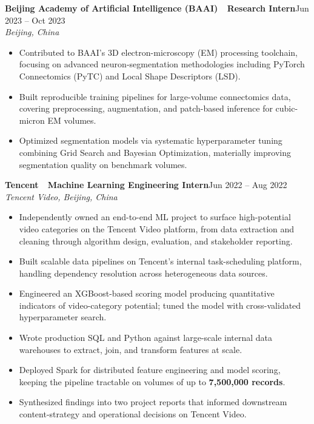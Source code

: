 \documentclass[11pt,letterpaper]{article}
\newcommand{\entry}[4]{%
  \noindent\textbf{\color{ink}#1}\hfill{\color{soft}\small #3}\\[1pt]%
  \textit{\color{muted}#2}\hfill\textit{\color{soft}\small #4}%
  \vspace{2pt}%
}
\begin{document}
\vspace{4pt}
\entry{Beijing Academy of Artificial Intelligence (BAAI) \,\textemdash\, Research Intern}{Beijing, China}{Jun 2023 -- Oct 2023}{}
\begin{itemize}
  \item Contributed to BAAI's 3D electron-microscopy (EM) processing toolchain, focusing on advanced neuron-segmentation methodologies including PyTorch Connectomics (PyTC) and Local Shape Descriptors (LSD).
  \item Built reproducible training pipelines for large-volume connectomics data, covering preprocessing, augmentation, and patch-based inference for cubic-micron EM volumes.
  \item Optimized segmentation models via systematic hyperparameter tuning combining Grid Search and Bayesian Optimization, materially improving segmentation quality on benchmark volumes.
\end{itemize}

\vspace{4pt}
\entry{Tencent \,\textemdash\, Machine Learning Engineering Intern}{Tencent Video, Beijing, China}{Jun 2022 -- Aug 2022}{}
\begin{itemize}
  \item Independently owned an end-to-end ML project to surface high-potential video categories on the Tencent Video platform, from data extraction and cleaning through algorithm design, evaluation, and stakeholder reporting.
  \item Built scalable data pipelines on Tencent's internal task-scheduling platform, handling dependency resolution across heterogeneous data sources.
  \item Engineered an XGBoost-based scoring model producing quantitative indicators of video-category potential; tuned the model with cross-validated hyperparameter search.
  \item Wrote production SQL and Python against large-scale internal data warehouses to extract, join, and transform features at scale.
  \item Deployed Spark for distributed feature engineering and model scoring, keeping the pipeline tractable on volumes of up to \textbf{7,500,000 records}.
  \item Synthesized findings into two project reports that informed downstream content-strategy and operational decisions on Tencent Video.
\end{itemize}

\end{document}
